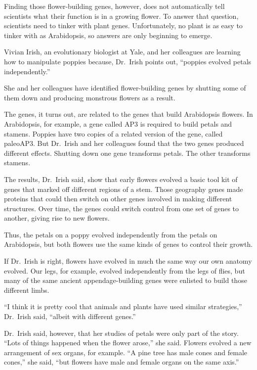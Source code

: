 ﻿\documentclass[12pt]{article}
\begin{document}
Finding those flower-building genes, however, does not automatically tell scientists what their
function is in a growing flower. To answer that question, scientists need to tinker\cite{tinker}
with plant genes. Unfortunately, no plant is as easy to tinker with as Arabidopsis, so answers are
only beginning to emerge.

Vivian Irish, an evolutionary biologist at Yale, and her colleagues are learning how to manipulate
poppies\cite{poppy} because, Dr.~Irish points out, ``poppies evolved petals independently.''

She and her colleagues have identified flower-building genes by shutting some of them down and
producing monstrous flowers as a result.

The genes, it turns out, are related to the genes that build Arabidopsis flowers. In Arabidopsis,
for example, a gene called AP3 is required to build petals and stamens. Poppies have two copies of a
related version of the gene, called paleoAP3. But Dr.~Irish and her colleagues found that the two
genes produced different effects. Shutting down one gene transforms petals. The other transforms
stamens.

The results, Dr.~Irish said, show that early flowers evolved a basic tool kit of genes that marked
off different regions of a stem. Those geography genes made proteins that could then switch on other
genes involved in making different structures. Over time, the genes could switch control from one
set of genes to another, giving rise to new flowers.

Thus, the petals on a poppy evolved independently from the petals on Arabidopsis, but both flowers
use the same kinds of genes to control their growth.

If Dr.~Irish is right, flowers have evolved in much the same way our own anatomy evolved. Our legs,
for example, evolved independently from the legs of flies, but many of the same ancient
appendage-building genes were enlisted to build those different limbs.

``I think it is pretty cool that animals and plants have used similar strategies,'' Dr.~Irish said,
``albeit with different genes.''

Dr.~Irish said, however, that her studies of petals were only part of the story. ``Lots of things
happened when the flower arose,'' she said. Flowers evolved a new arrangement of sex organs, for
example. ``A pine tree has male cones and female cones,'' she said, ``but flowers have male and
female organs on the same axis.''
\end{document}
